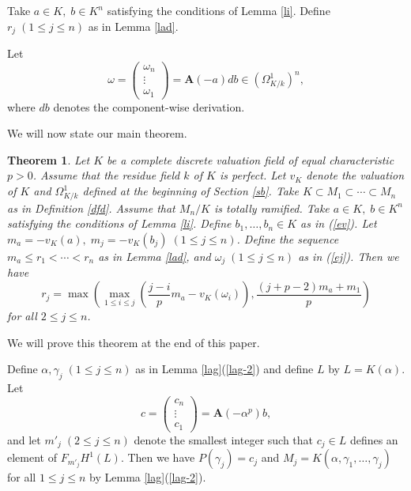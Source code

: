 \documentclass[sn-mathphys-num]{sn-jnl}
\numberwithin{equation}{section}
\theoremstyle{plain}
\newtheorem{theo}{Theorem}[section]
\theoremstyle{definition}
\begin{document}
Take $a\in K,\;b\in K^{n}$ satisfying the conditions of Lemma \ref{li}. Define $r_j\;(1\leq j\leq n)$ as in Lemma \ref{lad}.

 Let
  \begin{equation}\label{ej}
 \omega=
  \begin{pmatrix}
    {\omega_n}\\
    \vdots\\
    {\omega_1}
  \end{pmatrix}=\mathbf{A}(-a)db\in (\Omega_{K/k}^1)^n,
  \end{equation}
  where $db$ denotes the component-wise derivation.

  We will now state our main theorem.

  \begin{theo}\label{ta}
    Let $K$ be a complete discrete valuation field of equal characteristic $p>0$. Assume that the residue field $k$ of $K$ is perfect. Let $v_K$ denote the valuation of $K$ and $\Omega_{K/k}^1$ defined at the beginning of Section \ref{sb}. Take $K\subset M_1\subset\cdots\subset M_n$ as in Definition \ref{dfd}. Assume that $M_n/K$ is totally ramified. Take $a\in K,\;b\in K^n$ satisfying the conditions of Lemma \ref{li}. Define $b_1,\ldots,b_n\in K$ as in (\ref{ev}). Let $m_a=-v_K(a),\;m_j=-v_K(b_j)\;(1\leq j\leq n)$. Define the sequence $m_a\leq r_1<\cdots<r_n$ as in Lemma \ref{lad}, and $\omega_j\;(1\leq j\leq n)$ as in (\ref{ej}). Then we have
  \begin{equation}\label{ez}
  r_{j}=\max\left(\max_{1\leq i\leq j}\left(\frac{j-i}{p}m_a-v_K\left(\omega_i\right)\right),\frac{(j+p-2)m_a+m_1}{p}\right)
  \end{equation}
  for all $2\leq j\leq n$.
  \end{theo}

  We will prove this theorem at the end of this paper.

   Define $\alpha,\gamma_j\;(1\leq j\leq n)$ as in Lemma \ref{lag}(\ref{lag-2}) and define $L$ by $L=K(\alpha)$. Let
  \begin{equation}\label{ead}
    c=\begin{pmatrix}
    c_n\\
    \vdots\\
    c_1
    \end{pmatrix}
    =\mathbf{A}(-\alpha^p)b,
  \end{equation}
  and let $m'_j\;(2\leq j\leq n)$ denote the smallest integer such that $c_j\in L$ defines an element of $F_{m'_j}H^1(L)$. Then we have $P(\gamma_j)=c_j$ and $M_j=K(\alpha,\gamma_1,\ldots,\gamma_j)$ for all $1\leq j\leq n$ by Lemma \ref{lag}(\ref{lag-2}).
\end{document}

